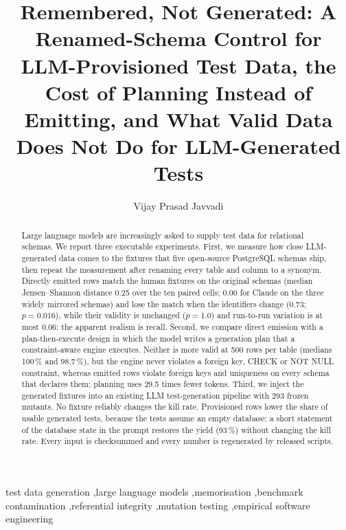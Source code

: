 \documentclass[preprint,12pt]{elsarticle}
\begin{document}
\begin{frontmatter}

\title{Remembered, Not Generated: A Renamed-Schema Control for LLM-Provisioned Test Data, the Cost of Planning Instead of Emitting, and What Valid Data Does Not Do for LLM-Generated Tests}

\author{Vijay Prasad Javvadi}
\address{Independent Researcher, Plainsboro, NJ, USA}

\begin{abstract}
Large language models are increasingly asked to supply test data for relational schemas. We report three executable experiments. First, we measure how close LLM-generated data comes to the fixtures that five open-source PostgreSQL schemas ship, then repeat the measurement after renaming every table and column to a synonym. Directly emitted rows match the human fixtures on the original schemas (median Jensen--Shannon distance 0.25 over the ten paired cells; 0.00 for Claude on the three widely mirrored schemas) and lose the match when the identifiers change (0.73; $p=0.016$), while their validity is unchanged ($p=1.0$) and run-to-run variation is at most 0.06: the apparent realism is recall. Second, we compare direct emission with a plan-then-execute design in which the model writes a generation plan that a constraint-aware engine executes. Neither is more valid at 500 rows per table (medians 100\,\% and 98.7\,\%), but the engine never violates a foreign key, CHECK or NOT NULL constraint, whereas emitted rows violate foreign keys and uniqueness on every schema that declares them; planning uses 29.5 times fewer tokens. Third, we inject the generated fixtures into an existing LLM test-generation pipeline with 293 frozen mutants. No fixture reliably changes the kill rate. Provisioned rows lower the share of usable generated tests, because the tests assume an empty database; a short statement of the database state in the prompt restores the yield (93\,\%) without changing the kill rate. Every input is checksummed and every number is regenerated by released scripts.
\end{abstract}

\begin{keyword}
test data generation \sep large language models \sep memorisation \sep benchmark contamination \sep referential integrity \sep mutation testing \sep empirical software engineering
\end{keyword}
\end{frontmatter}
\end{document}
